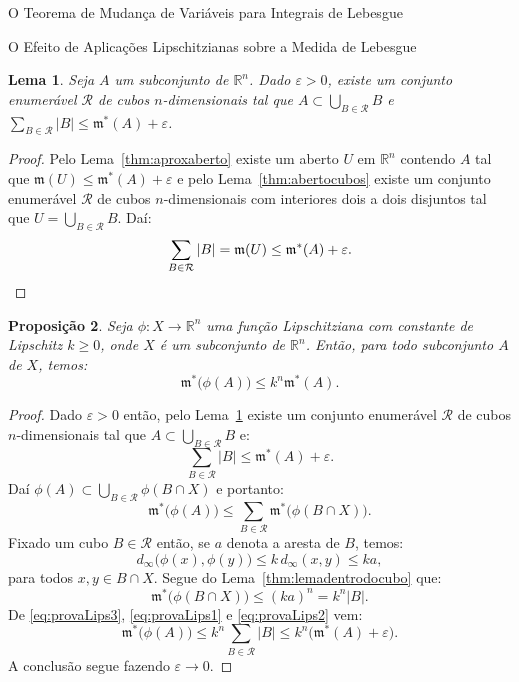 \documentclass[oneside,final,11pt]{amsbook}
\newcommand{\R}{\mathds R}
\newcommand{\leb}{\mathfrak m}
\theoremstyle{remark}\newtheorem{exercise}{Exercício}[chapter]
\theoremstyle{remark}\newtheorem{*exercise}[exercise]{\hbox to 0pt{\hskip 0pt minus 1fil*}Exercício}
\theoremstyle{definition}\newtheorem{exdefin}{Definição}[chapter]
\theoremstyle{plain}\newtheorem{teo}{Teorema}[section]
\theoremstyle{plain}\newtheorem{lem}[teo]{Lema}
\theoremstyle{plain}\newtheorem{prop}[teo]{Proposição}
\theoremstyle{plain}\newtheorem{cor}[teo]{Corolário}
\theoremstyle{definition}\newtheorem{defin}[teo]{Definição}
\theoremstyle{remark}\newtheorem{rem}[teo]{Observação}
\theoremstyle{definition}\newtheorem{notation}[teo]{Notação}
\theoremstyle{definition}\newtheorem{convention}[teo]{Convenção}
\theoremstyle{definition}\newtheorem{example}[teo]{Exemplo}
\numberwithin{section}{chapter}
\numberwithin{equation}{section}
\begin{document}
\begin{chapter}{O Teorema de Mudança de Variáveis para Integrais de Lebesgue}
\begin{section}{O Efeito de Aplicações Lipschitzianas sobre a Medida de Lebesgue}
\begin{lem}\label{thm:medextcubos}
Seja $A$ um subconjunto de $\R^n$. Dado $\varepsilon>0$, existe um conjunto enumerável
$\mathcal R$ de cubos $n$-dimensionais tal que $A\subset\bigcup_{B\in\mathcal R}B$
e $\sum_{B\in\mathcal R}\vert B\vert\le\leb^*(A)+\varepsilon$.
\end{lem}
\begin{proof}
Pelo Lema~\ref{thm:aproxaberto} existe um aberto $U$ em $\R^n$ contendo $A$ tal que
$\leb(U)\le\leb^*(A)+\varepsilon$ e pelo Lema~\ref{thm:abertocubos} existe um conjunto
enumerável $\mathcal R$ de cubos $n$-dimensionais com interiores dois a dois disjuntos
tal que $U=\bigcup_{B\in\mathcal R}B$. Daí:
\[\sum_{B\in\mathcal R}\vert B\vert=\leb(U)\le\leb^*(A)+\varepsilon.\qedhere\]
\end{proof}

\begin{prop}\label{thm:propefeitoLips}
Seja $\phi:X\to\R^n$ uma função Lipschitziana com constante de Lipschitz $k\ge0$, onde
$X$ é um subconjunto de $\R^n$. Então, para todo subconjunto $A$ de $X$, temos:
\[\leb^*\big(\phi(A)\big)\le k^n\leb^*(A).\]
\end{prop}
\begin{proof}
Dado $\varepsilon>0$ então, pelo Lema~\ref{thm:medextcubos} existe um conjunto enumerável
$\mathcal R$ de cubos $n$-dimensionais tal que $A\subset\bigcup_{B\in\mathcal R}B$
e:
\begin{equation}\label{eq:provaLips3}
\sum_{B\in\mathcal R}\vert B\vert\le\leb^*(A)+\varepsilon.
\end{equation}
Daí $\phi(A)\subset\bigcup_{B\in\mathcal R}\phi(B\cap X)$ e portanto:
\begin{equation}\label{eq:provaLips1}
\leb^*\big(\phi(A)\big)\le\sum_{B\in\mathcal R}\leb^*\big(\phi(B\cap X)\big).
\end{equation}
Fixado um cubo $B\in\mathcal R$ então, se $a$ denota a aresta de $B$, temos:
\[d_\infty\big(\phi(x),\phi(y)\big)\le k\,d_\infty(x,y)\le ka,\]
para todos $x,y\in B\cap X$. Segue do Lema~\ref{thm:lemadentrodocubo} que:
\begin{equation}\label{eq:provaLips2}
\leb^*\big(\phi(B\cap X)\big)\le(ka)^n=k^n\vert B\vert.
\end{equation}
De \eqref{eq:provaLips3}, \eqref{eq:provaLips1} e \eqref{eq:provaLips2} vem:
\[\leb^*\big(\phi(A)\big)\le k^n\sum_{B\in\mathcal R}\vert B\vert\le k^n\big(\leb^*(A)+\varepsilon\big).\]
A conclusão segue fazendo $\varepsilon\to0$.
\end{proof}


\end{section}
\end{chapter}
\end{document}
